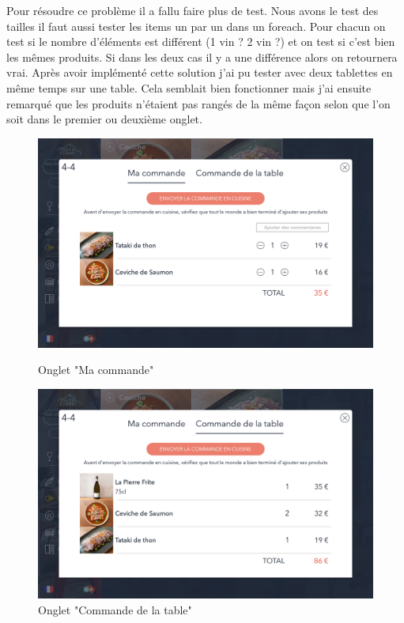 \clearpage

Pour résoudre ce problème il a fallu faire plus de test. Nous avons le test des tailles il faut aussi tester les items un par un dans un foreach. Pour chacun on test si le nombre d'éléments est différent (1 vin ? 2 vin ?) et on test si c'est bien les mêmes produits. Si dans les deux cas il y a une différence alors on retournera vrai. Après avoir implémenté cette solution j'ai pu tester avec deux tablettes en même temps sur une table. Cela semblait bien fonctionner mais j'ai ensuite remarqué que les produits n'étaient pas rangés de la même façon selon que l'on soit dans le premier ou deuxième onglet.

\begin{figure}[!htb]
  \centering
  \begin{minipage}[b]{0.45\textwidth}
    \includegraphics[width=\textwidth]{images/selection2.png}
    \caption{Onglet "Ma commande"}
  \end{minipage}
  \hfill
  \begin{minipage}[b]{0.45\textwidth}
    \includegraphics[width=\textwidth]{images/selection3.png}
    \caption{Onglet "Commande de la table"}
  \end{minipage}
\end{figure}

